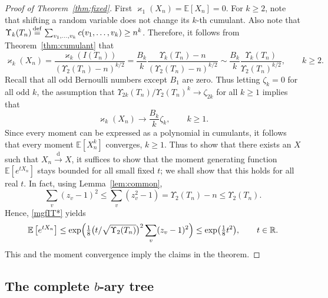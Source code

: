 \documentclass[11pt]{article}
\newcommand{\E}[1]{\mathbb{E} \left[#1\right]}
\def\R{\mathbb{R}}
\def\U{\Upsilon}
\numberwithin{theorem}{section}
\theoremstyle{definition}
\newcommand{\inlaw}{\dto}%
\newcommand{\eqd}{\,{\buildrel {\mathrm{def}} \over =}\,}
\numberwithin{equation}{section}
\newcommand{\refT}[1]{Theorem~\ref{#1}}
\newcommand{\refL}[1]{Lemma~\ref{#1}}
\newcommand\kk{\varkappa}
\newcommand\bigpar[1]{\bigl(#1\bigr)}
\newcommand\Bigpar[1]{\Bigl(#1\Bigr)}
\newcommand{\too}{\longrightarrow}
\newcommand\dto{\overset{\mathrm{d}}{\too}}
\begin{document}
\begin{proof}[Proof of {\refT{thm:fixed}}]
    First \(\kk_{1}(X_n) = \E{X_n} = 0\).
         For \(k \ge 2\), note that shifting a random variable does not change its \(k\)-th cumulant.
         Also note that \(\Upsilon_k(T_n) \eqd \sum_{v_1,\dots,v_k} c(v_1,\dots,v_k) \ge n^k\).
        Therefore, it follows from \refT{thm:cumulant} that
    \[
        \kk_{k}(X_n) 
        = \frac{ \kk_{k}(I(T_n)) }{(\Upsilon_{2}(T_n)-n)^{k/2}}
        = \frac{B_k}{k} \frac{\Upsilon_{k}(T_n)-n}{(\Upsilon_{2}(T_n)-n)^{k/2}}
        \sim \frac{B_k}{k} \frac{\Upsilon_{k}(T_n)}{\Upsilon_{2}(T_n)^{k/2}}
        , 
        \qquad
        k \ge 2.
    \]
    Recall that all odd Bernoulli numbers except \(B_1\) are zero. 
    Thus letting \(\zeta_k=0\) for all odd \(k\), 
    the assumption 
    that \( \Upsilon_{2k}(T_n)/\Upsilon_{2}(T_n)^{k} \to \zeta_{2k}\) for all $k \ge 1$
    implies that
    \[
        \kk_{k}(X_n) \to \frac{B_k}{k} \zeta_k, \qquad k \ge 1.
    \]
Since every moment can be expressed as a polynomial in cumulants, it follows
that every moment $\E{X_n^k}$ converges, $k\ge1$.
Thus to show that there exists an \(X\) such that \(X_n \inlaw X\), it suffices to show that the
moment generating function $\E{ e^{t X_n}}$ stays bounded for all small fixed
$t$;
we shall show that this holds for all real $t$.
In fact, using \refL{lem:common},
\begin{equation}
  \sum_v(z_v-1)^2
\le   \sum_v(z_v^2-1)
=
\U_2(T_n)-n
\le
\U_2(T_n)
.
\end{equation}
Hence, \eqref{mgfIT*} yields
\begin{equation}
  \E{e^{tX_n}}
\le \exp\Bigpar{\tfrac18 \bigpar{t/\sqrt{\U_2(T_n)}}^2\sum_v(z_v-1)^2}
\le \exp\bigpar{\tfrac18 t^2},
\qquad t\in\R.
\end{equation}
This and the moment convergence imply the claims in the theorem.
\end{proof}

\subsection{The complete \texorpdfstring{$b$}{b}-ary tree}\label{sec:complete}
\end{document}
